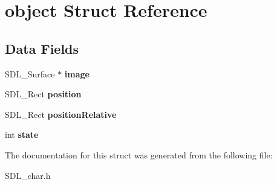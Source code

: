 \hypertarget{structobject}{}\section{object Struct Reference}
\label{structobject}
\subsection*{Data Fields}
\begin{DoxyCompactItemize}
\item 
\mbox{\label{structobject_ae8f96dd75368fdcaecd7186e0cf6795b}} 
S\+D\+L\+\_\+\+Surface $\ast$ {\bfseries image}
\item 
\mbox{\label{structobject_a3285ee8872b0cc5eac8a3ab962eaca8d}} 
S\+D\+L\+\_\+\+Rect {\bfseries position}
\item 
\mbox{\label{structobject_a47f3254b4bebecf259984b1ac751bc0b}} 
S\+D\+L\+\_\+\+Rect {\bfseries position\+Relative}
\item 
\mbox{\label{structobject_a85d5b4e144fe0635ef91778ad2a0c3e1}} 
int {\bfseries state}
\end{DoxyCompactItemize}


The documentation for this struct was generated from the following file\+:\begin{DoxyCompactItemize}
\item 
S\+D\+L\+\_\+char.\+h\end{DoxyCompactItemize}
